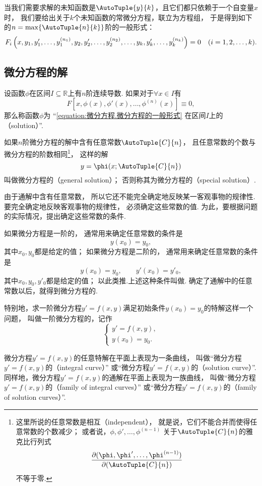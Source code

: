 当我们需要求解的未知函数是\(\AutoTuple{y}{k}\)，且它们都只依赖于一个自变量\(x\)时，
我们要给出关于\(k\)个未知函数的常微分方程，联立为方程组，
于是得到如下的\(n = \max\{\AutoTuple{n}{k}\}\)阶的一般形式：\[
	\def\y#1{y_{#1},y_{#1}',\dotsc,y_{#1}^{(n_#1)}}%
	F_i\left(x,\y{1},\y{2},\dotsc,\y{k}\right)=0
	\quad(i=1,2,\dotsc,k).
\]

\subsection{微分方程的解}
\begin{definition}
设函数\(\phi\)在区间\(I\subseteq\mathbb{R}\)上有\(n\)阶连续导数.
如果对于\(\forall x \in I\)有\[
	F\left[x,\phi(x),\phi'(x),\dotsc,\phi^{(n)}(x)\right]\equiv0,
\]
那么称函数\(\phi\)为
“\cref{equation:微分方程.微分方程的一般形式}
在区间\(I\)上的（solution）”.

如果\(n\)阶微分方程的解中含有任意常数\(\AutoTuple{C}{n}\)，
且任意常数的个数与微分方程的阶数相同\footnote{%
这里所说的任意常数是相互（independent），
就是说，它们不能合并而使得任意常数的个数减少；
或者说，\(\phi,\phi',\dotsc,\phi^{(n-1)}\)
关于\(\AutoTuple{C}{n}\)的雅克比行列式\[
	\jacobi{\phi,\phi',\dotsc,\phi^{(n-1)}}{\AutoTuple{C}{n}}
\]不等于零.}，
这样的解\[
	y = \phi(x;\AutoTuple{C}{n})
\]叫做微分方程的（general solution）；
否则称其为微分方程的（special solution）.
\end{definition}

由于通解中含有任意常数，
所以它还不能完全确定地反映某一客观事物的规律性.
要完全确定地反映客观事物的规律性，
必须确定这些常数的值.
为此，要根据问题的实际情况，提出确定这些常数的条件.

如果微分方程是一阶的，
通常用来确定任意常数的条件是\[
	y(x_0) = y_0,
\]
其中\(x_0,y_0\)都是给定的值；
如果微分方程是二阶的，
通常用来确定任意常数的条件是\[
	y(x_0) = y_0,
	\qquad
	y'(x_0) = y'_0,
\]
其中\(x_0,y_0,y'_0\)都是给定的值；
以此类推.上述这种条件叫做.
确定了通解中的任意常数以后，就得到微分方程的.

特别地，求一阶微分方程\(y'=f(x,y)\)满足初始条件\(y(x_0) = y_0\)的特解这样一个问题，
叫做一阶微分方程的，记作\[
	\left\{ \begin{array}{l}
		y' = f(x,y), \\
		y(x_0) = y_0.
	\end{array} \right.
\]

微分方程\(y'=f(x,y)\)的任意特解在平面上表现为一条曲线，
叫做“微分方程\(y'=f(x,y)\)的（integral curve）”
或“微分方程\(y'=f(x,y)\)的（solution curve）”.
同样地，微分方程\(y'=f(x,y)\)的通解在平面上表现为一族曲线，
叫做“微分方程\(y'=f(x,y)\)的（family of integral curves）”
或“微分方程\(y'=f(x,y)\)的（family of solution curves）”.

